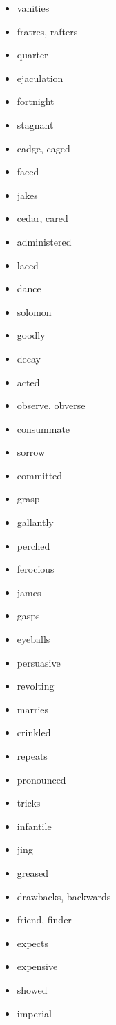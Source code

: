 \documentclass{article}
\begin{document}
\begin{itemize}
    \item vanities
    \item fratres, rafters
    \item quarter
    \item ejaculation
    \item fortnight
    \item stagnant
    \item cadge, caged
    \item faced
    \item jakes
    \item cedar, cared
    \item administered
    \item laced
    \item dance
    \item solomon
    \item goodly
    \item decay
    \item acted
    \item observe, obverse
    \item consummate
    \item sorrow
    \item committed
    \item grasp
    \item gallantly
    \item perched
    \item ferocious
    \item james
    \item gasps
    \item eyeballs
    \item persuasive
    \item revolting
    \item marries
    \item crinkled
    \item repeats
    \item pronounced
    \item tricks
    \item infantile
    \item jing
    \item greased
    \item drawbacks, backwards
    \item friend, finder
    \item expects
    \item expensive
    \item showed
    \item imperial

\end{itemize}
\end{document}

